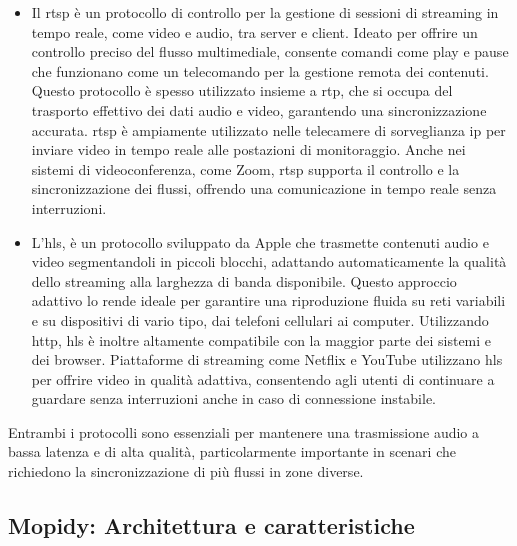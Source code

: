 \begin{itemize}
    \item Il \gls{rtsp} è un protocollo di controllo per la gestione di sessioni di streaming in tempo reale, come video e audio, tra server e client. Ideato per offrire un controllo preciso del flusso multimediale, 
                              consente comandi come play e pause che funzionano come un telecomando per la gestione remota dei contenuti. Questo protocollo è spesso utilizzato insieme a \gls{rtp}, 
                                    che si occupa del trasporto effettivo dei dati audio e video, garantendo una sincronizzazione accurata.
                                          \gls{rtsp} è ampiamente utilizzato nelle telecamere di sorveglianza \gls{ip} per inviare video in tempo reale alle postazioni di monitoraggio. Anche nei sistemi di videoconferenza, 
                                                come Zoom, \gls{rtsp} supporta il controllo e la sincronizzazione dei flussi, offrendo una comunicazione in tempo reale senza interruzioni. \cite{s17040846}
          
    \item L'\gls{hls}, è un protocollo sviluppato da Apple che trasmette contenuti audio e video segmentandoli in piccoli blocchi, adattando automaticamente la qualità dello streaming alla larghezza di banda disponibile. 
                              Questo approccio adattivo lo rende ideale per garantire una riproduzione fluida su reti variabili e su dispositivi di vario tipo, dai telefoni cellulari ai computer. 
                                    Utilizzando \gls{http}, \gls{hls} è inoltre altamente compatibile con la maggior parte dei sistemi e dei browser.
                                          Piattaforme di streaming come Netflix e YouTube utilizzano \gls{hls} per offrire video in qualità adattiva, consentendo agli utenti di continuare a guardare senza interruzioni anche in caso di connessione instabile. \cite{flussonic2024}
  \end{itemize}

Entrambi i protocolli sono essenziali per mantenere una trasmissione audio a bassa latenza e di alta qualità, particolarmente importante in scenari che richiedono la sincronizzazione di più flussi in zone diverse. 

\subsection{Mopidy: Architettura e caratteristiche}
\noindent

